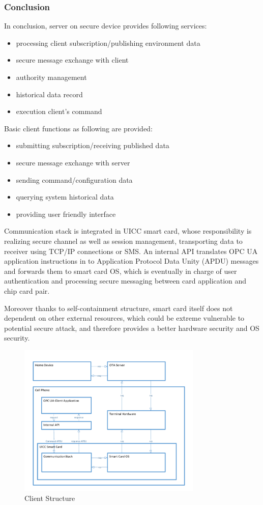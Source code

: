 \subsubsection{Conclusion}\label{secFunction}
In conclusion, server on secure device provides following services:
 \begin{itemize}
  \item processing client subscription/publishing environment data
  \item secure message exchange with client
  \item authority management
  \item historical data record
  \item execution client's command
\end{itemize}
Basic client functions as following are provided:
 \begin{itemize}
  \item submitting subscription/receiving published data
  \item secure message exchange with server
  \item sending command/configuration data
  \item querying system historical data
  \item providing user friendly interface
\end{itemize}

Communication stack is integrated in UICC smart card, whose responsibility is realizing secure channel as well as session management, transporting data to receiver using TCP/IP connections or SMS. An internal API translates OPC UA application instructions in to Application Protocol Data Unity (APDU) messages and forwards them to smart card OS, which is eventually in charge of user authentication and processing secure messaging between card application and chip card pair. 

Moreover thanks to self-containment structure, smart card itself does not dependent on other external resources, which could be extreme vulnerable to potential secure attack, and therefore provides a better hardware security and OS security. 

 \begin{figure}
	\centering
	\includegraphics[width=0.78\textwidth]{clientStructure}
		\caption{Client Structure}
	\label{fig:clientStructure}
\end{figure}

